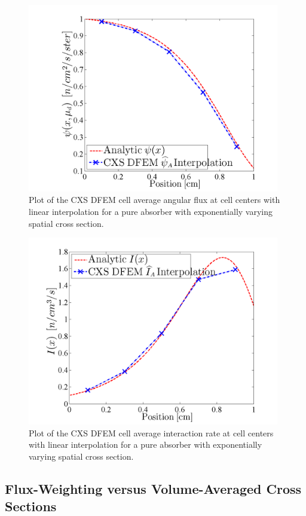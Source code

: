 \begin{figure}[!htp]
\centering
\includegraphics[width=11cm]{chapter3_variable_xs/CXS_Psi_A_Profile.png}
\caption{Plot of the CXS DFEM cell average angular flux at cell centers with linear interpolation for a pure absorber with exponentially varying spatial cross section.}
\label{fig:cxs_avg_psi}
\end{figure}
%
\begin{figure}[!hbp]
\centering
\includegraphics[width=11cm]{chapter3_variable_xs/CXS_I_A_Profile.png}
\caption{Plot of the CXS DFEM cell average interaction rate at cell centers with linear interpolation for a pure absorber with exponentially varying spatial cross section.}
\label{fig:cxs_avg_ir}
\end{figure}


%
\subsection{Flux-Weighting versus Volume-Averaged Cross Sections}

